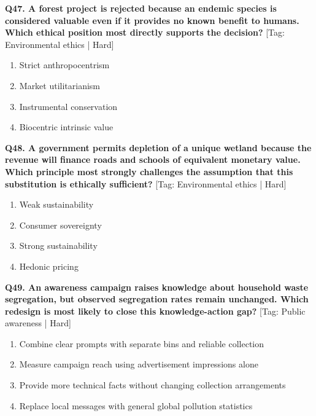 \noindent\textbf{Q47. A forest project is rejected because an endemic species is considered valuable even if it provides no known benefit to humans. Which ethical position most directly supports the decision?} \hfill [Tag: Environmental ethics | Hard]
\begin{enumerate}[label=(\alph*),topsep=2pt,itemsep=1pt,partopsep=0pt,parsep=0pt]
    \item {Strict anthropocentrism}
    \item {Market utilitarianism}
    \item {Instrumental conservation}
    \item {Biocentric intrinsic value}
\end{enumerate}
\vspace{2mm}

\noindent\textbf{Q48. A government permits depletion of a unique wetland because the revenue will finance roads and schools of equivalent monetary value. Which principle most strongly challenges the assumption that this substitution is ethically sufficient?} \hfill [Tag: Environmental ethics | Hard]
\begin{enumerate}[label=(\alph*),topsep=2pt,itemsep=1pt,partopsep=0pt,parsep=0pt]
    \item {Weak sustainability}
    \item {Consumer sovereignty}
    \item {Strong sustainability}
    \item {Hedonic pricing}
\end{enumerate}
\vspace{2mm}

\noindent\textbf{Q49. An awareness campaign raises knowledge about household waste segregation, but observed segregation rates remain unchanged. Which redesign is most likely to close this knowledge-action gap?} \hfill [Tag: Public awareness | Hard]
\begin{enumerate}[label=(\alph*),topsep=2pt,itemsep=1pt,partopsep=0pt,parsep=0pt]
    \item {Combine clear prompts with separate bins and reliable collection}
    \item {Measure campaign reach using advertisement impressions alone}
    \item {Provide more technical facts without changing collection arrangements}
    \item {Replace local messages with general global pollution statistics}
\end{enumerate}
\vspace{2mm}

